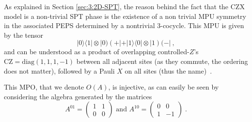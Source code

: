 \documentclass[rmp,aps,reprint,superscriptaddress,nobalancelastpage]{revtex4-1}
\newcommand{\ket}[1]{\vert#1\rangle}
\newcommand{\bra}[1]{\langle#1\vert}
\begin{document}
As explained in Section \ref{sec:3:2D-SPT}, the reason behind the fact that the CZX model is a non-trivial SPT phase is the existence of a non trivial MPU symmetry in the associated PEPS determined by a nontrivial 3-cocycle. This MPU is given by the tensor
$$\ket{0}\bra{1} \otimes |0)(+|+ \ket{1}\bra{0}\otimes |1)(-|\ ,$$
and can be understood as a product of overlapping controlled-$Z$'s $\mathrm{CZ}=\mathrm{diag}(1,1,1,-1)$ between all adjacent sites (as they commute, the ordering does not matter), followed by a Pauli $X$ on all sites (thus the name)~\cite{chen:2d-spt-phases-peps-ghz}.

This MPO, that we denote $O(A)$, is injective, as can easily be seen by considering the algebra generated by the matrices
$$
    A^{01}= \begin{pmatrix}1&1 \\ 0&0 \end{pmatrix} \text{ and }  A^{10}=\begin{pmatrix}0&0\\1&-1\end{pmatrix}\;.
$$
\end{document}
